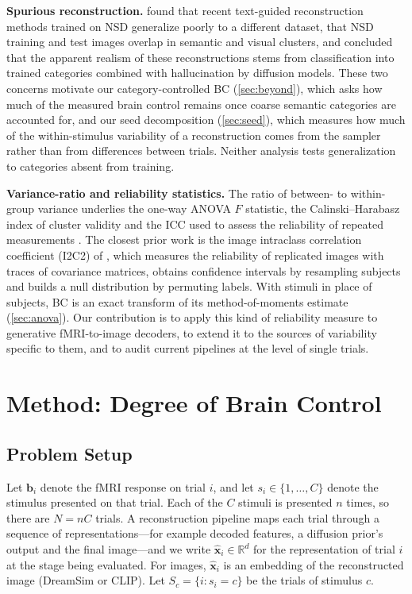 \documentclass[11pt,a4paper]{article}
\begin{document}
\textbf{Spurious reconstruction.} \citet{shirakawa2025} found that recent
text-guided reconstruction methods trained on NSD generalize poorly to a
different dataset, that NSD training and test images overlap in semantic and
visual clusters, and concluded that the apparent realism of these
reconstructions stems from classification into trained categories combined with
hallucination by diffusion models. These two concerns motivate our
category-controlled BC (\cref{sec:beyond}), which asks how much of the measured
brain control remains once coarse semantic categories are accounted for, and
our seed decomposition (\cref{sec:seed}), which measures how much of the
within-stimulus variability of a reconstruction comes from the sampler rather
than from differences between trials.
Neither analysis tests generalization to categories absent from training.

\textbf{Variance-ratio and reliability statistics.} The ratio of between- to
within-group variance underlies the one-way ANOVA $F$ statistic, the
Calinski--Harabasz index of cluster validity \citep{calinski1974} and the ICC
used to assess the reliability of repeated measurements \citep{shrout1979}. The
closest prior work is the image intraclass correlation coefficient (I2C2) of
\citet{shou2013}, which measures the reliability of replicated images with
traces of covariance matrices, obtains confidence intervals by resampling
subjects and builds a null distribution by permuting labels. With stimuli in
place of subjects, BC is an exact transform of its method-of-moments estimate
(\cref{sec:anova}). Our contribution is to apply this kind of reliability
measure to generative fMRI-to-image decoders, to extend it to the sources of
variability specific to them, and to audit current pipelines at the level of
single trials.

\section{Method: Degree of Brain Control}
\label{sec:method}

\subsection{Problem Setup}

Let $\mathbf{b}_i$ denote the fMRI response on trial $i$, and let
$s_i\in\{1,\ldots,C\}$ denote the stimulus presented on that trial. Each of the
$C$ stimuli is presented $n$ times, so there are $N=nC$ trials. A reconstruction
pipeline maps each trial through a sequence of representations---for example
decoded features, a diffusion prior's output and the final image---and we write
$\hat{\mathbf{x}}_i\in\mathbb{R}^d$ for the representation of trial $i$ at the
stage being evaluated. For images, $\hat{\mathbf{x}}_i$ is an embedding of the
reconstructed image (DreamSim or CLIP). Let $S_c=\{i:s_i=c\}$ be the trials of
stimulus $c$.
\end{document}
